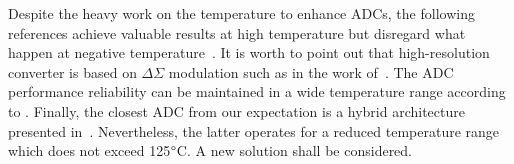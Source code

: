 Despite the heavy work on the temperature to enhance ADCs, the following references achieve valuable results at high temperature but disregard what happen at negative temperature~\cite{Rahman2017,Davis2003,Ericson2004}. It is worth to point out that high-resolution converter is based on \(\Delta\Sigma \) modulation such as in the work of~\cite{Souri2014,Davis2003,Ericson2004}. The ADC performance reliability can be maintained in a wide temperature range according to \cite{Fonseca2018}. Finally, the closest ADC from our expectation is a hybrid architecture presented in~\cite{Souri2014}. Nevertheless, the latter operates for a reduced temperature range which does not exceed 125\(\degree \)C. A new solution shall be considered.
